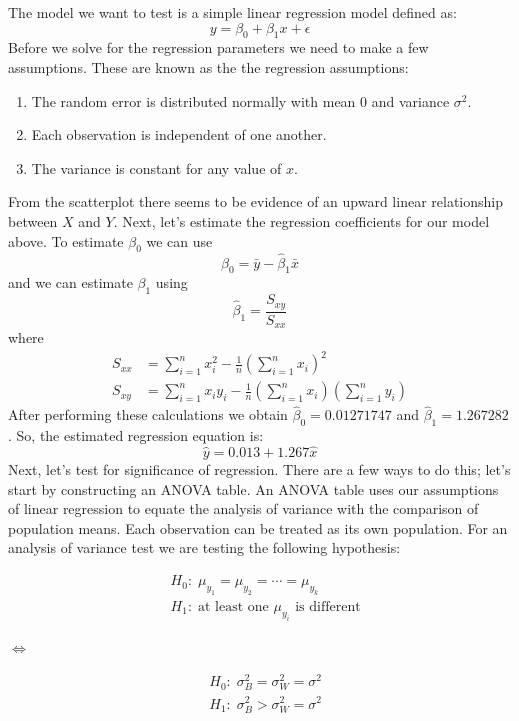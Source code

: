 \documentclass[12pt,letterpaper]{article}
\begin{document}
The model we want to test is a simple linear regression model defined as: $$y=\beta_0+\beta_1x+\epsilon$$ Before we solve for the regression parameters we need to make a few assumptions. These are known as the the regression assumptions:

\begin{enumerate}
\item The random error is distributed normally with mean 0 and variance $\sigma^2$.
\item Each observation is independent of one another.
\item The variance is constant for any value of $x$.
\end{enumerate}

From the scatterplot there seems to be evidence of an upward linear relationship between $X$ and $Y$. Next, let's estimate the regression coefficients for our model above. To estimate $\beta_0$ we can use $$\hat{\beta}_0=\bar{y}-\hat{\beta}_1\bar{x}$$ and we can estimate $\beta_1$ using $$\hat{\beta}_1=\frac{S_{xy}}{S_{xx}}$$ where
\begin{align*}
S_{xx}&=\sum_{i=1}^nx_i^2-\frac{1}{n}\left(\sum_{i=1}^nx_i\right)^2\\
S_{xy}&=\sum_{i=1}^nx_iy_i-\frac{1}{n}\left(\sum_{i=1}^nx_i\right)\left(\sum_{i=1}^ny_i\right)
\end{align*}
After performing these calculations we obtain $\hat{\beta}_0=0.01271747$ and $\hat{\beta}_1=1.267282$. So, the estimated regression equation is: $$\hat{y}=0.013+1.267\hat{x}$$ Next, let's test for significance of regression. There are a few ways to do this; let's start by constructing an ANOVA table. An ANOVA table uses our assumptions of linear regression to equate the analysis of variance with the comparison of population means. Each observation can be treated as its own population. For an analysis of variance test we are testing the following hypothesis:

\begin{minipage}{0.5\textwidth}
\begin{align*}
	&H_0:\;\mu_{y_1}=\mu_{y_2}=\cdots=\mu_{y_k}\\
	&H_1:\; \text{at least one $\mu_{y_i}$ is different}
\end{align*}
\end{minipage}
\begin{minipage}{0.1\textwidth}
\vspace*{5mm}
$\iff$
\end{minipage}
\begin{minipage}{0.3\textwidth}
\begin{align*}
	&H_0:\; \sigma_B^2=\sigma_W^2=\sigma^2\\
	&H_1:\; \sigma_B^2>\sigma_W^2=\sigma^2
\end{align*}
\end{minipage}
\end{document}
